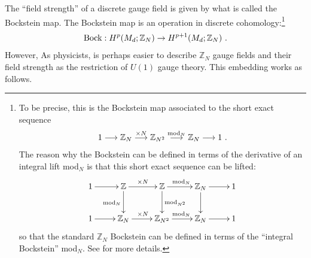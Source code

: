 \documentclass[11pt]{article}
\newcommand{\eq}[1]{\begin{align}\begin{split}#1\end{split}\end{align}}
\def\IZ{{\mathbb{Z}}}
\begin{document}
The ``field strength'' of a discrete gauge field is given by what is called the Bockstein map. The Bockstein map is an operation in discrete cohomology:\footnote{
To be precise, this is the Bockstein map associated to the short exact sequence \eq{1\longrightarrow \IZ_N \overset{\times N}{\longrightarrow} \IZ_{N^2} \overset{{\rm mod}_N}{\longrightarrow}\IZ_N\longrightarrow 1~.} 
The reason why the Bockstein can be defined in terms of the derivative of an integral lift mod$_N$ is that this short exact sequence can be lifted:
\eq{
\xymatrix{
1\ar[r]&\IZ \ar[r]^{\times N}\ar[d]_{{\rm mod}_N}&\IZ \ar[r]^{{\rm mod}_N}\ar[d]^{{\rm mod}_{N^2}}&\IZ_N\ar[r]\ar[d]&1\\
1\ar[r]&\IZ_N\ar[r]^{\times N}&\IZ_{N^2}\ar[r]^{{\rm mod}_N}&\IZ_N\ar[r]&1
}
}
so that the standard $\IZ_N$ Bockstein can be defined in terms of the ``integral Bockstein'' mod$_N$.  
See \cite{Benini:2018reh} for more details.}
\eq{
{\rm Bock}:H^p(M_d;\IZ_N)\to H^{p+1}(M_d;\IZ_N)~.
}
  However, As physicists, is perhaps easier to describe $\IZ_N$ gauge fields and their field strength as the restriction of $U(1)$ gauge theory. This embedding works as follows.  
\end{document}
